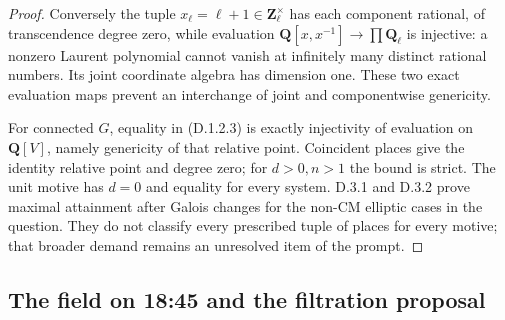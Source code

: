 \begin{proof}
Conversely the tuple \(x_\ell=\ell+1\in\mathbf Z_\ell^\times\)
has each component rational, of transcendence degree zero, while
evaluation \(\mathbf Q[x,x^{-1}]\to\prod\mathbf Q_\ell\) is
injective: a nonzero Laurent polynomial cannot vanish at infinitely
many distinct rational numbers. Its joint coordinate algebra has
dimension one. These two exact evaluation maps prevent an interchange
of joint and componentwise genericity.

For connected \(G\), equality in (D.1.2.3) is exactly injectivity of
evaluation on \(\mathbf Q[V]\), namely genericity of that relative
point. Coincident places give the identity relative point and degree
zero; for \(d>0,n>1\) the bound is strict. The unit motive has \(d=0\)
and equality for every system. D.3.1 and D.3.2 prove maximal attainment
after Galois changes for the non-CM elliptic cases in the question.
They do not classify every prescribed tuple of places for every
motive; that broader demand remains an unresolved item of the prompt.
\end{proof}

\subsection{The field on 18:45 and the filtration proposal}

